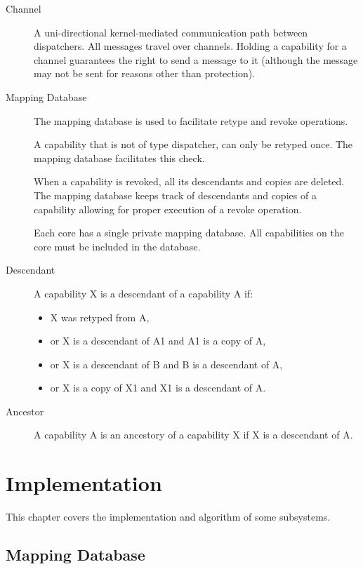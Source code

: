 \documentclass{scrreprt}
\begin{document}
\begin{description}
  \item[Channel] A uni-directional kernel-mediated communication path
    between dispatchers. All messages travel over channels. Holding a
    capability for a channel guarantees the right to send a message to it
    (although the message may not be sent for reasons other than
    protection).

    \item[Mapping Database] The mapping database is used to facilitate
      retype and revoke operations.

      A capability that is not of type dispatcher, can only be retyped once.
      The mapping database facilitates this check.

      When a capability is revoked, all its descendants and copies are deleted.
      The mapping database keeps track of descendants and copies of a capability
      allowing for proper execution of a revoke operation.

      Each core has a single private mapping database.
      All capabilities on the core must be included in the database.

  \item[Descendant] A capability X is a descendant of a capability A if:

    \begin{itemize}
      \item X was retyped from A,
      \item or X is a descendant of A1 and A1 is a copy of A,
      \item or X is a descendant of B and B is a descendant of A,
      \item or X is a copy of X1 and X1 is a descendant of A.
    \end{itemize}

  \item[Ancestor] A capability A is an ancestory of a capability X
    if X is a descendant of A.
  \end{description}

  \chapter{Implementation}

  This chapter covers the implementation and algorithm of some subsystems.

  \section{Mapping Database}
\end{document}
